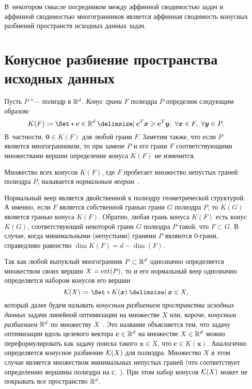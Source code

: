 В~некотором смысле посредником между аффинной сводимостью задач и аффинной сводимостью многогранников является аффинная сводимость конусных разбиений пространств исходных данных задач.

%
%
\section{Конусное разбиение пространства исходных данных}
\label{sec:Cones}

Пусть $P$ "--- полиэдр в $\mathbb{R}^d$. 
\emph{Конус грани} $F$ полиэдра $P$ определим следующим образом:
\[
K(F) \coloneqq \Set*{\bm{c}\in\R^d \given  \bm{c}^T \bm{x} \ge \bm{c}^T \bm{y}, \ \forall \bm{x} \in F, \ \forall \bm{y} \in P}.
\]
В~частности, $\bm{0} \in K(F)$ для любой грани $F$.
Заметим также, что если $P$ является многогранником, то при замене $P$ и его грани $F$ соответствующими множествами вершин определение конуса $K(F)$ не изменится.

Множество всех конусов $K(F)$, где $F$ пробегает множество непустых граней полиэдра $P$, называется \emph{нормальным веером}~\cite[с.~257]{ZieglerBook}.

Нормальный веер является двойственной к полиэдру геометрической структурой.
А именно, если $F$ является собственной гранью грани $G$ полиэдра $P$, то $K(G)$ является гранью конуса $K(F)$.
Обратно, любая грань конуса $K(F)$ есть конус $K(G)$, соответствующий некоторой грани $G$ полиэдра $P$ такой, что $F \subset G$. В случае, когда минимальными (непустыми) гранями $P$ являются 0-грани, справедливо равенство $\dim K(F) = d - \dim(F)$.

Так как любой выпуклый многогранник $P \subset \mathbb{R}^d$ однозначно определяется множеством своих вершин $X = \operatorname{ext}(P)$, то и его нормальный веер однозначно определяется набором конусов его вершин
\[
\K(X) \coloneqq \Set*{K(\bm{x}) \given \bm{x} \in X},
\]
который далее будем называть \emph{конусным разбиением пространства исходных данных} задачи линейной оптимизации на множестве $X$ или, короче, \emph{конусным разбиением} $\mathbb{R}^d$ по множеству $X$~\cite{BondBook:1995}.
Это название объясняется тем, что задачу оптимизации вдоль целевого вектора $\bm{c}\in\mathbb{R}^d$ на множестве $X \in \mathbb{R}^d$ можно переформулировать как задачу поиска такого $\bm{x} \in X$, что $\bm{c} \in K(\bm{x})$.
Аналогично определяется конусное разбиение ${\mathcal K}(X)$ для полиэдра. Множество $X$ в этом случае является множеством минимальных непустых граней (что соответствует определению вершины полиэдра на с.~\pageref{def:PolyVertex}). При этом набор конусов ${\mathcal K}(X)$ может не покрывать все пространство $\mathbb{R}^d$.

